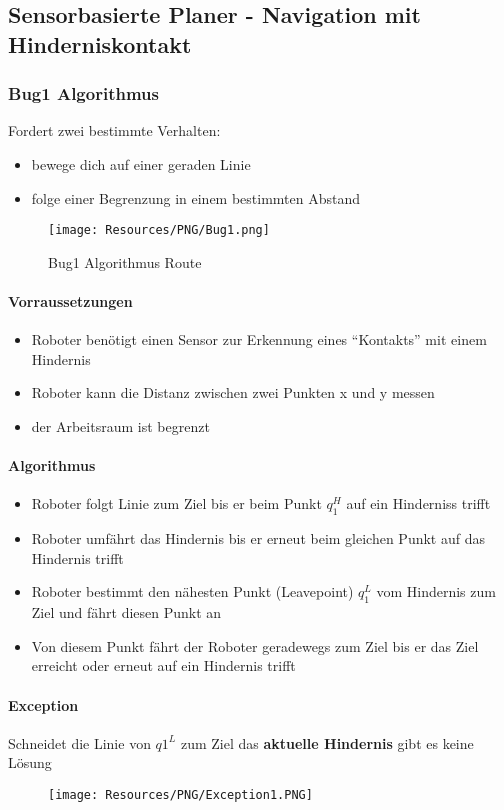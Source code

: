 \subsection{Sensorbasierte Planer - Navigation mit Hinderniskontakt}
\subsubsection{Bug1 Algorithmus}
Fordert zwei bestimmte Verhalten:
\begin{itemize}
	\item bewege dich auf einer geraden Linie
	\item folge einer Begrenzung in einem bestimmten Abstand
\end{itemize}
\begin{figure}[H]
	\begin{center}
		\texttt{[image: Resources/PNG/Bug1.png]}
		\caption{Bug1 Algorithmus Route}
		\label{fig:PNG/Bug1.png}
	\end{center}
\end{figure}
\paragraph{Vorraussetzungen}
\begin{itemize}
	\item Roboter benötigt einen Sensor zur Erkennung eines \enquote{Kontakts} mit einem Hindernis
	\item Roboter kann die Distanz zwischen zwei Punkten x und y messen
	\item der Arbeitsraum ist begrenzt
\end{itemize}
\paragraph{Algorithmus}
\begin{itemize}
	\item Roboter folgt Linie zum Ziel bis er beim Punkt $q_1^H$ auf ein Hinderniss trifft
	\item Roboter umfährt das Hindernis bis er erneut beim gleichen Punkt auf das Hindernis trifft
	\item Roboter bestimmt den nähesten Punkt (Leavepoint) $q_1^L$ vom Hindernis zum Ziel und fährt diesen Punkt an
	\item Von diesem Punkt fährt der Roboter geradewegs zum Ziel bis er das Ziel erreicht oder erneut auf ein Hindernis trifft
\end{itemize}
\paragraph{Exception}
Schneidet die Linie von $q1^L$ zum Ziel das \textbf{aktuelle Hindernis} gibt es keine Lösung
\begin{figure}[H]
	\begin{center}
		\texttt{[image: Resources/PNG/Exception1.PNG]}
		\caption{}
		\label{fig:PNG/Exception1.PNG}
	\end{center}
\end{figure}
